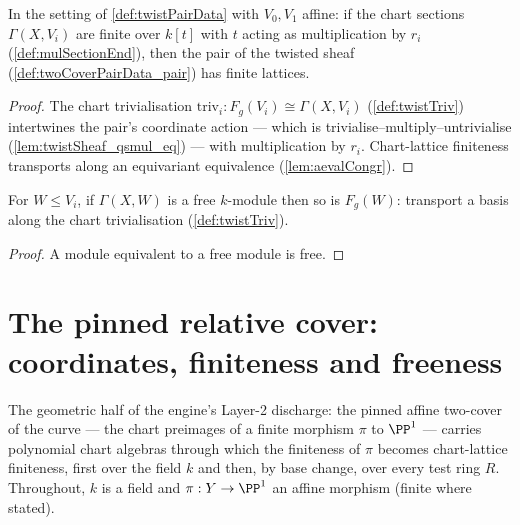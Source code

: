\begin{theorem}
  \label{thm:moduleFinite_aeval_twistPair}
  \leanok
  In the setting of \ref{def:twistPairData} with \(V_0, V_1\) affine: if the chart
  sections \(\Gamma(X, V_i)\) are finite over \(k[t]\) with \(t\) acting as
  multiplication by \(r_i\) (\ref{def:mulSectionEnd}), then the pair of the twisted
  sheaf (\ref{def:twoCoverPairData_pair}) has finite lattices.
\end{theorem}
\begin{proof}
  \leanok
  The chart trivialisation \(\mathrm{triv}_i : F_g(V_i) \cong \Gamma(X, V_i)\)
  (\ref{def:twistTriv}) intertwines the pair's coordinate action --- which is
  trivialise--multiply--untrivialise (\ref{lem:twistSheaf_qsmul_eq}) --- with
  multiplication by \(r_i\). Chart-lattice finiteness transports along an equivariant
  equivalence (\ref{lem:aevalCongr}).
\end{proof}

\begin{theorem}
  \label{thm:free_twistSheafSections}
  \leanok
  For \(W \le V_i\), if \(\Gamma(X, W)\) is a free \(k\)-module then so is
  \(F_g(W)\): transport a basis along the chart trivialisation
  (\ref{def:twistTriv}).
\end{theorem}
\begin{proof}
  \leanok
  A module equivalent to a free module is free.
\end{proof}

\section{The pinned relative cover: coordinates, finiteness and freeness}
\label{sec:relative_cover_coordinates}

The geometric half of the engine's Layer-2 discharge: the pinned affine two-cover of the
curve --- the chart preimages of a finite morphism \(\pi\) to \(\PP^1\) --- carries
polynomial chart algebras through which the finiteness of \(\pi\) becomes chart-lattice
finiteness, first over the field \(k\) and then, by base change, over every test ring
\(R\). Throughout, \(k\) is a field and \(\pi : Y \to \PP^1\) an affine morphism (finite
where stated).

